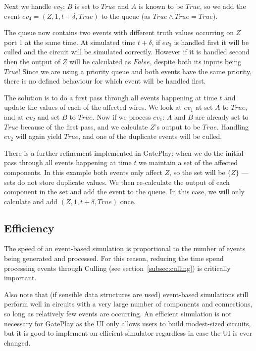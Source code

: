 Next we handle $ev_2$: $B$ is set to $True$ and $A$ is known to be $True$, so we add the event $ev_4 = (Z, 1, t + \delta, True)$ to the queue (as $True \land True = True$).

The queue now contains two events with different truth values occurring on $Z$ port $1$ at the same time. At simulated time $t + \delta$, if $ev_3$ is handled first it will be culled and the circuit will be simulated correctly. However if it is handled second then the output of $Z$ will be calculated as $False$, despite both its inputs being $True$! Since we are using a priority queue and both events have the same priority, there is no defined behaviour for which event will be handled first.

The solution is to do a first pass through all events happening at time $t$ and update the values of each of the affected wires. We look at $ev_1$ at set $A$ to $True$, and at $ev_2$ and set $B$ to $True$. Now if we process $ev_1$: $A$ and $B$ are already set to $True$ because of the first pass, and we calculate $Z$'s output to be $True$. Handling $ev_2$ will again yield $True$, and one of the duplicate events will be culled.

There is a further refinement implemented in GatePlay: when we do the initial pass through all events happening at time $t$ we maintain a set  of the affected components. In this example both events only affect $Z$, so the set will be $\{Z\}$ --- sets do not store duplicate values. We then re-calculate the output of each component in the set and add the event to the queue. In this case, we will only calculate and add $(Z, 1, t + \delta, True)$ once.

\subsection{Efficiency}
The speed of an event-based simulation is proportional to the number of events being generated and processed. For this reason, reducing the time spend processing events through Culling (see section~\ref{subsec:culling}) is critically important.

Also note that (if sensible data structures are used) event-based simulations still perform well in circuits with a very large number of components and connections, so long as relatively few events are occurring. An efficient simulation is not necessary for GatePlay as the UI only allows users to build modest-sized circuits, but it is good to implement an efficient simulator regardless in case the UI is ever changed.

